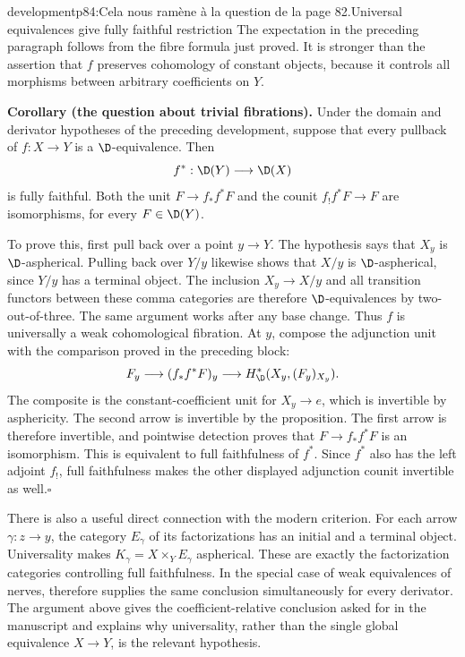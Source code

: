 \begin{dcomment}{development}{p84:Cela nous ramène à la question de la page 82.}{Universal equivalences give fully faithful restriction}
The expectation in the preceding paragraph follows from the fibre formula just proved. It is stronger than the assertion that $f$ preserves cohomology of constant objects, because it controls all morphisms between arbitrary coefficients on $Y$.

\textbf{Corollary (the question about trivial fibrations).}\ours
Under the domain and derivator hypotheses of the preceding development, suppose that every pullback of $f:X\to Y$ is a $\D$-equivalence. Then
\[
 f^*:\D(Y)\longrightarrow\D(X)
\]
is fully faithful. Both the unit $F\to f_*f^*F$ and the counit $f_!f^*F\to F$ are isomorphisms, for every $F\in\D(Y)$.

To prove this, first pull back over a point $y\to Y$. The hypothesis says that $X_y$ is $\D$-aspherical. Pulling back over $Y/y$ likewise shows that $X/y$ is $\D$-aspherical, since $Y/y$ has a terminal object. The inclusion $X_y\to X/y$ and all transition functors between these comma categories are therefore $\D$-equivalences by two-out-of-three. The same argument works after any base change. Thus $f$ is universally a weak cohomological fibration. At $y$, compose the adjunction unit with the comparison proved in the preceding block:
\[
 F_y\longrightarrow(f_*f^*F)_y
 \longrightarrow H^*_{\D}(X_y,(F_y)_{X_y}).
\]
The composite is the constant-coefficient unit for $X_y\to e$, which is invertible by asphericity. The second arrow is invertible by the proposition. The first arrow is therefore invertible, and pointwise detection proves that $F\to f_*f^*F$ is an isomorphism. This is equivalent to full faithfulness of $f^*$. Since $f^*$ also has the left adjoint $f_!$, full faithfulness makes the other displayed adjunction counit invertible as well.\hfill$\square$

There is also a useful direct connection with the modern criterion. For each arrow $\gamma:z\to y$, the category $E_\gamma$ of its factorizations has an initial and a terminal object. Universality makes $K_\gamma=X\times_YE_\gamma$ aspherical. These are exactly the factorization categories controlling full faithfulness. In the special case of weak equivalences of nerves, \citet[Theorem 6.10]{GrothStovicek2016Trees} therefore supplies the same conclusion simultaneously for every derivator. The argument above gives the coefficient-relative conclusion asked for in the manuscript and explains why universality, rather than the single global equivalence $X\to Y$, is the relevant hypothesis.
\end{dcomment}

